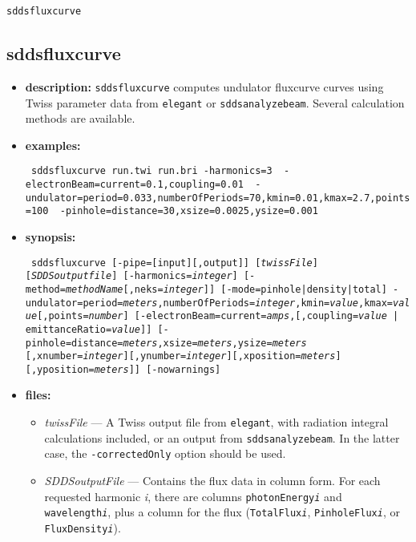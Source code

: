\documentclass[11pt]{article}
\begin{document}
\begin{latexonly}
\newpage
\begin{center}{\Large\verb|sddsfluxcurve|}\end{center}
\end{latexonly}
\subsection{sddsfluxcurve}

\begin{itemize}
\item {\bf description:} {\tt sddsfluxcurve} computes undulator fluxcurve curves using
Twiss parameter data from {\tt elegant} or {\tt sddsanalyzebeam}. Several calculation
methods are available.

\item {\bf examples:}
\begin{flushleft}{\tt
sddsfluxcurve run.twi run.bri -harmonics=3 \
  -electronBeam=current=0.1,coupling=0.01 \
  -undulator=period=0.033,numberOfPeriods=70,kmin=0.01,kmax=2.7,points=100 \
  -pinhole=distance=30,xsize=0.0025,ysize=0.001 
}\end{flushleft}

\item {\bf synopsis:}
\begin{flushleft}{\tt
sddsfluxcurve [-pipe=[input][,output]] [{\em twissFile}] [{\em SDDSoutputfile}]
    [-harmonics={\em integer}] [-method={\em methodName}[,neks={\em integer}]]
    [-mode={pinhole|density|total}]
    -undulator=period={\em meters},numberOfPeriods={\em integer},kmin={\em value},kmax={\em value}[,points={\em number}]
    [-electronBeam=current={\em amps},[,{coupling={\em value} | emittanceRatio={\em value}}]]
    [-pinhole=distance={\em meters},xsize={\em meters},ysize={\em meters}
    [,xnumber={\em integer}][,ynumber={\em integer}][,xposition={\em meters}][,yposition={\em meters}]]
    [-nowarnings]
}\end{flushleft}

\item {\bf files:}
\begin{itemize}
\item {\em twissFile} --- A Twiss output file from {\tt elegant}, with radiation integral 
calculations included, or an output from {\tt sddsanalyzebeam}. In the latter case, the
{\tt -correctedOnly} option should be used.
\item {\em SDDSoutputFile} --- Contains the flux data in column form.  For each 
requested harmonic {\em i}, there are columns {\tt photonEnergy{\em i}} and {\tt wavelength{\em i}},
plus a column for the flux ({\tt TotalFlux{\em i}}, {\tt PinholeFlux{\em i}}, or {\tt FluxDensity{\em i}}).
\end{itemize}


\end{itemize}
\end{document}
